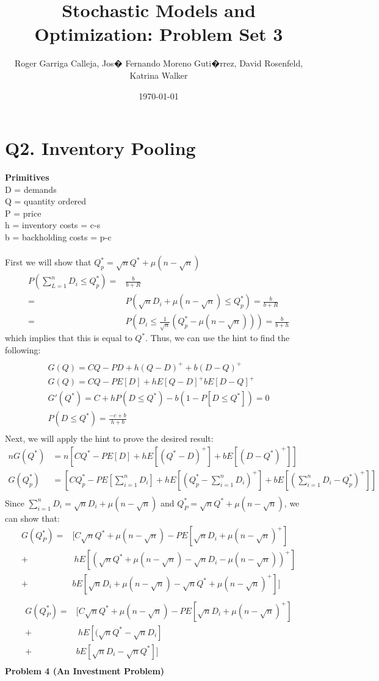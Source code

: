 \documentclass[11pt, english]{article}
\title{Stochastic Models and Optimization: Problem Set 3}
\author{Roger Garriga Calleja, Jos� Fernando Moreno Guti�rrez, David Rosenfeld, Katrina Walker}
\date{\today}
\begin{document}
	
\section{Q2. Inventory Pooling}
\textbf{Primitives}\\ D = demands \\ Q = quantity ordered \\ P = price \\ h =
inventory costs =  c-s \\ b = backholding costs = p-c \\ \\ First we will show
that $Q_p^* = \sqrt{n}Q^* + \mu(n- \sqrt{n})$%
\begin{align*} P (\sum_{L= 1}^n D_i \leq Q_p^*) = &  \frac{b}{b+R} \\ = &
P(\sqrt{n}D_i + \mu(n - \sqrt{n})\leq Q_p^*) = \frac{b}{b+R} \\ = & P(D_i \leq
\frac{1}{\sqrt{n}}(Q_p^*- \mu(n-\sqrt{n})))= \frac{b}{b + h} \end{align*} which
implies that this is equal to $Q^*$. Thus, we can use the hint to find the
following: 
\begin{align*} %
\end{align*}
\begin{align*} G(Q) = CQ - PD + h(Q-D)^++b(D-Q)^+ \\ G(Q) = CQ -
PE[D] + hE[Q-D]^+bE[D-Q]^+ \\ G'(Q^*)= C + hP(D \leq Q^*) - b(1-P[D\leq Q^*]) =
0 \\ P(D \leq Q^*) = \frac{-c+b}{h+b} \\ 
\end{align*} Next, we will apply the hint to prove the desired result:
\begin{align*} nG(Q^*) &=
n[CQ^*-PE[D]+hE[(Q^*-D)^+]+bE[(D-Q^*)^+]]\\ G(Q^*_p) & =
[CQ^*_p-PE[\sum_{i=1}^nD_i]+hE[(Q^*_p-\sum_{i=1}^nD_i)^+]+bE[(\sum_{i=1}^nD_i-Q^*_p)^+]]\\ 
\end{align*} 
Since $\sum_{i = 1}^nD_i = \sqrt{n}D_i+\mu(n-\sqrt{n})$ and $Q^*_P = \sqrt{n}Q^*+\mu(n-\sqrt{n})$, we can show that:\\
\begin{align*} 
G(Q^*_P) = & [C\sqrt{n}Q^*+\mu(n-\sqrt{n})-PE[\sqrt{n}D_i +  \mu(n-\sqrt{n})^+]\\
+& \ hE[(\sqrt{n}Q^*+\mu(n-\sqrt{n})-\sqrt{n}D_i-\mu(n-\sqrt{n}))^+] \\
+& b E[\sqrt{n}D_i+\mu(n-\sqrt{n})-\sqrt{n}Q^*+\mu(n-\sqrt{n})^+]]\\ 
\end{align*} 
\begin{align*} 
G(Q^*_P) = & [C\sqrt{n}Q^*+\mu(n-\sqrt{n})-PE[\sqrt{n}D_i +  \mu(n-\sqrt{n})^+]\\
+& \ hE[(\sqrt{n}Q^*-\sqrt{n}D_i] \\
+& b E[\sqrt{n}D_i-\sqrt{n}Q^*]]\\ 
\end{align*} 
\textbf{Problem 4 (An Investment Problem)}
\end{document}
